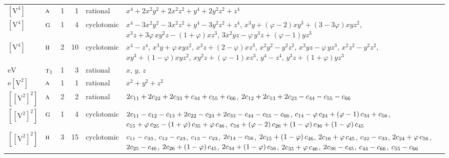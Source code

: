 \documentclass[10pt,a4paper]{article}
\numberwithin{equation}{section}
\newcommand{\irr}[1]{\text{\normalfont\scshape #1}}
\newcommand{\goldenratio}{\varphi}
\newcommand{\jahn}[1]{\mathrm{#1}}
\newlength{\fillwidth}\newlength{\cellwidth}\newlength{\colwidth}
\newcommand{\signbreak}{\penalty100\relax}
\begin{document}
{\begin{longtable}{@{}llrrl>{\RaggedRight\arraybackslash}p{\fillwidth}@{}}
$\jahn{[V^{4}]}$ & $\irr{a}$ & 1 & 1 & rational & $x^{4} + 2x^{2}y^{2} + 2x^{2}z^{2} + y^{4} + 2y^{2}z^{2} + z^{4}$\\
$\jahn{[V^{4}]}$ & $\irr{g}$ & 1 & 4 & cyclotomic & $x^{4} - 3x^{2}y^{2} - 3x^{2}z^{2} + y^{4} - 3y^{2}z^{2} + z^{4}$, $x^{3}y + \left(\goldenratio - 2\right)xy^{3} + \left(3 - 3\goldenratio{}\right)xyz^{2}$, $x^{3}z + 3\goldenratio{}\,xy^{2}z - \left(1 + \goldenratio{}\right)xz^{3}$, $3x^{2}yz - \goldenratio{}\,y^{3}z + \left(\goldenratio - 1\right)yz^{3}$\\
$\jahn{[V^{4}]}$ & $\irr{h}$ & 2 & 10 & cyclotomic & $x^{4} - z^{4}$, $x^{3}y + \goldenratio{}\,xyz^{2}$, $x^{3}z + \left(2 - \goldenratio{}\right)xz^{3}$, $x^{2}y^{2} - y^{2}z^{2}$, $x^{2}yz - \goldenratio{}\,yz^{3}$, $x^{2}z^{2} - y^{2}z^{2}$, $xy^{3} + \left(1 - \goldenratio{}\right)xyz^{2}$, $xy^{2}z + \left(\goldenratio - 1\right)xz^{3}$, $y^{4} - z^{4}$, $y^{3}z + \left(1 + \goldenratio{}\right)yz^{3}$\\
$\jahn{eV}$ & $\irr{t}_{1}$ & 1 & 3 & rational & $x$, $y$, $z$\\
$\jahn{e[V^{2}]}$ & $\irr{a}$ & 1 & 1 & rational & $x^{2} + y^{2} + z^{2}$\\
$\jahn{[[V^{2}]^{2}]}$ & $\irr{a}$ & 2 & 2 & rational & $2c_{11} +\signbreak 2c_{22} +\signbreak 2c_{33} +\signbreak c_{44} +\signbreak c_{55} +\signbreak c_{66}$, $2c_{12} +\signbreak 2c_{13} +\signbreak 2c_{23} -\signbreak c_{44} -\signbreak c_{55} -\signbreak c_{66}$\\
$\jahn{[[V^{2}]^{2}]}$ & $\irr{g}$ & 1 & 4 & cyclotomic & $2c_{11} -\signbreak c_{12} -\signbreak c_{13} +\signbreak 2c_{22} -\signbreak c_{23} +\signbreak 2c_{33} -\signbreak c_{44} -\signbreak c_{55} -\signbreak c_{66}$, $c_{14} -\signbreak \goldenratio{}\,c_{24} +\signbreak \left(\goldenratio -\signbreak 1\right)c_{34} +\signbreak c_{56}$, $c_{15} +\signbreak \goldenratio{}\,c_{25} -\signbreak \left(1 +\signbreak \goldenratio{}\right)c_{35} +\signbreak \goldenratio{}\,c_{46}$, $c_{16} +\signbreak \left(\goldenratio -\signbreak 2\right)c_{26} +\signbreak \left(1 -\signbreak \goldenratio{}\right)c_{36} +\signbreak \left(1 -\signbreak \goldenratio{}\right)c_{45}$\\
$\jahn{[[V^{2}]^{2}]}$ & $\irr{h}$ & 3 & 15 & cyclotomic & $c_{11} -\signbreak c_{33}$, $c_{12} -\signbreak c_{23}$, $c_{13} -\signbreak c_{23}$, $2c_{14} -\signbreak c_{56}$, $2c_{15} +\signbreak \left(1 -\signbreak \goldenratio{}\right)c_{46}$, $2c_{16} +\signbreak \goldenratio{}\,c_{45}$, $c_{22} -\signbreak c_{33}$, $2c_{24} +\signbreak \goldenratio{}\,c_{56}$, $2c_{25} -\signbreak c_{46}$, $2c_{26} +\signbreak \left(1 -\signbreak \goldenratio{}\right)c_{45}$, $2c_{34} +\signbreak \left(1 -\signbreak \goldenratio{}\right)c_{56}$, $2c_{35} +\signbreak \goldenratio{}\,c_{46}$, $2c_{36} -\signbreak c_{45}$, $c_{44} -\signbreak c_{66}$, $c_{55} -\signbreak c_{66}$\\

\end{longtable}}
\end{document}
